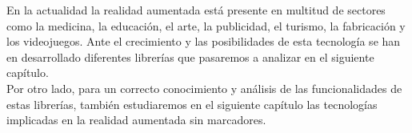 En la actualidad la realidad aumentada está presente en multitud de sectores como la medicina, la educación, el arte, la publicidad, el turismo, la fabricación y los videojuegos. Ante el crecimiento y las posibilidades de esta tecnología se han en desarrollado diferentes librerías que pasaremos a analizar en el siguiente capítulo.\\

Por otro lado, para un correcto conocimiento y análisis de las funcionalidades de estas librerías, también estudiaremos en el siguiente capítulo las tecnologías implicadas en la realidad aumentada sin marcadores.\\


\noindent
